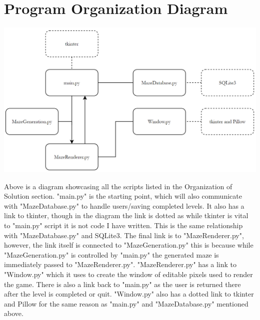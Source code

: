 \documentclass{article}
\begin{document}
\section{Program Organization Diagram}
\begin{center}
	\includegraphics[scale=0.5]{Code Organization Diagram}
\end{center}
Above is a diagram showcasing all the scripts listed in the Organization of Solution section. "main.py" is the starting point, which will also communicate with "MazeDatabase.py"
to handle users/saving completed levels. It also has a link to tkinter, though in the diagram the link is dotted as while tkinter is vital to "main.py" script it is not code I have written.
This is the same relationship with "MazeDatabase.py" and SQLite3. The final link is to "MazeRenderer.py", however, the link itself is connected to "MazeGeneration.py" this is because
while "MazeGeneration.py" is controlled by "main.py" the generated maze is immediately passed to "MazeRenderer.py".
"MazeRenderer.py" has a link to "Window.py" which it uses to create the window of editable pixels used to render the game. There is also a link back to "main.py" as the user
is returned there after the level is completed or quit. "Window.py" also has a dotted link to tkinter and Pillow for the same reason as "main.py" and "MazeDatabase.py" mentioned above.
\clearpage
\end{document}
